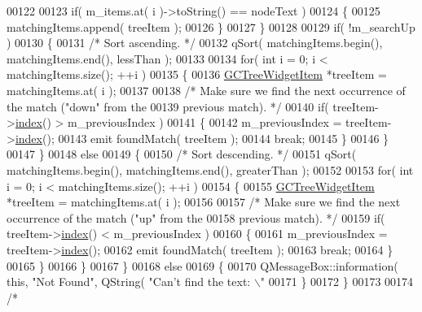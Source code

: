 \begin{DoxyCode}
00122 
00123       \textcolor{keywordflow}{if}( m\_items.at( i )->toString() == nodeText )
00124       \{
00125         matchingItems.append( treeItem );
00126       \}
00127     \}
00128 
00129     \textcolor{keywordflow}{if}( !m\_searchUp )
00130     \{
00131       \textcolor{comment}{/* Sort ascending. */}
00132       qSort( matchingItems.begin(), matchingItems.end(), lessThan );
00133 
00134       \textcolor{keywordflow}{for}( \textcolor{keywordtype}{int} i = 0; i < matchingItems.size(); ++i )
00135       \{
00136         \hyperlink{class_g_c_tree_widget_item}{GCTreeWidgetItem} *treeItem = matchingItems.at( i );
00137 
00138         \textcolor{comment}{/* Make sure we find the next occurrence of the match ("down" from the}
00139 \textcolor{comment}{          previous match). */}
00140         \textcolor{keywordflow}{if}( treeItem->\hyperlink{class_g_c_tree_widget_item_af6b48ae274cc4989811ef44944c8ad76}{index}() > m\_previousIndex )
00141         \{
00142           m\_previousIndex = treeItem->\hyperlink{class_g_c_tree_widget_item_af6b48ae274cc4989811ef44944c8ad76}{index}();
00143           emit foundMatch( treeItem );
00144           \textcolor{keywordflow}{break};
00145         \}
00146       \}
00147     \}
00148     \textcolor{keywordflow}{else}
00149     \{
00150       \textcolor{comment}{/* Sort descending. */}
00151       qSort( matchingItems.begin(), matchingItems.end(), greaterThan );
00152 
00153       \textcolor{keywordflow}{for}( \textcolor{keywordtype}{int} i = 0; i < matchingItems.size(); ++i )
00154       \{
00155         \hyperlink{class_g_c_tree_widget_item}{GCTreeWidgetItem} *treeItem = matchingItems.at( i );
00156 
00157         \textcolor{comment}{/* Make sure we find the next occurrence of the match ("up" from the}
00158 \textcolor{comment}{          previous match). */}
00159         \textcolor{keywordflow}{if}( treeItem->\hyperlink{class_g_c_tree_widget_item_af6b48ae274cc4989811ef44944c8ad76}{index}() < m\_previousIndex )
00160         \{
00161           m\_previousIndex = treeItem->\hyperlink{class_g_c_tree_widget_item_af6b48ae274cc4989811ef44944c8ad76}{index}();
00162           emit foundMatch( treeItem );
00163           \textcolor{keywordflow}{break};
00164         \}
00165       \}
00166     \}
00167   \}
00168   \textcolor{keywordflow}{else}
00169   \{
00170     QMessageBox::information( \textcolor{keyword}{this}, \textcolor{stringliteral}{"Not Found"}, QString( \textcolor{stringliteral}{"Can't find the text:
      \(\backslash\)"%
00171   \}
00172 \}
00173 
00174 \textcolor{comment}{/*
}}
\end{DoxyCode}
